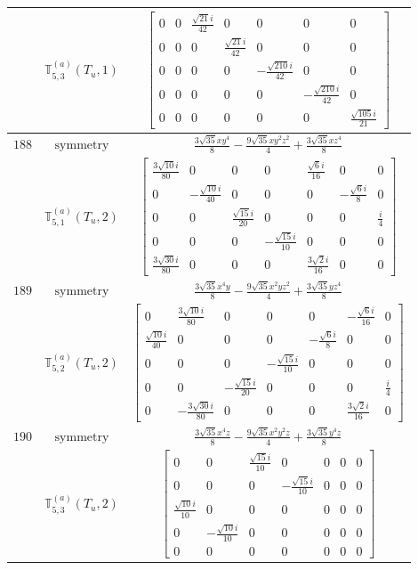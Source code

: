 \documentclass[fleqn,8pt,landscape]{jsarticle}
\begin{document}
\begin{longtable}{ccc}
$  $ & $ \mathbb{T}_{5,3}^{(a)}(T_{u},1) $ & $ \begin{bmatrix} 0 & 0 & \frac{\sqrt{21} i}{42} & 0 & 0 & 0 & 0 \\ 0 & 0 & 0 & \frac{\sqrt{21} i}{42} & 0 & 0 & 0 \\ 0 & 0 & 0 & 0 & - \frac{\sqrt{210} i}{42} & 0 & 0 \\ 0 & 0 & 0 & 0 & 0 & - \frac{\sqrt{210} i}{42} & 0 \\ 0 & 0 & 0 & 0 & 0 & 0 & \frac{\sqrt{105} i}{21} \end{bmatrix} $ \\ \hline
$ 188 $ & $ \text{symmetry} $ & $ \frac{3 \sqrt{35} x y^{4}}{8} - \frac{9 \sqrt{35} x y^{2} z^{2}}{4} + \frac{3 \sqrt{35} x z^{4}}{8} $ \\
$  $ & $ \mathbb{T}_{5,1}^{(a)}(T_{u},2) $ & $ \begin{bmatrix} \frac{3 \sqrt{10} i}{80} & 0 & 0 & 0 & \frac{\sqrt{6} i}{16} & 0 & 0 \\ 0 & - \frac{\sqrt{10} i}{40} & 0 & 0 & 0 & - \frac{\sqrt{6} i}{8} & 0 \\ 0 & 0 & \frac{\sqrt{15} i}{20} & 0 & 0 & 0 & \frac{i}{4} \\ 0 & 0 & 0 & - \frac{\sqrt{15} i}{10} & 0 & 0 & 0 \\ \frac{3 \sqrt{30} i}{80} & 0 & 0 & 0 & \frac{3 \sqrt{2} i}{16} & 0 & 0 \end{bmatrix} $ \\ \hline
$ 189 $ & $ \text{symmetry} $ & $ \frac{3 \sqrt{35} x^{4} y}{8} - \frac{9 \sqrt{35} x^{2} y z^{2}}{4} + \frac{3 \sqrt{35} y z^{4}}{8} $ \\
$  $ & $ \mathbb{T}_{5,2}^{(a)}(T_{u},2) $ & $ \begin{bmatrix} 0 & \frac{3 \sqrt{10} i}{80} & 0 & 0 & 0 & - \frac{\sqrt{6} i}{16} & 0 \\ \frac{\sqrt{10} i}{40} & 0 & 0 & 0 & - \frac{\sqrt{6} i}{8} & 0 & 0 \\ 0 & 0 & 0 & - \frac{\sqrt{15} i}{10} & 0 & 0 & 0 \\ 0 & 0 & - \frac{\sqrt{15} i}{20} & 0 & 0 & 0 & \frac{i}{4} \\ 0 & - \frac{3 \sqrt{30} i}{80} & 0 & 0 & 0 & \frac{3 \sqrt{2} i}{16} & 0 \end{bmatrix} $ \\ \hline
$ 190 $ & $ \text{symmetry} $ & $ \frac{3 \sqrt{35} x^{4} z}{8} - \frac{9 \sqrt{35} x^{2} y^{2} z}{4} + \frac{3 \sqrt{35} y^{4} z}{8} $ \\
$  $ & $ \mathbb{T}_{5,3}^{(a)}(T_{u},2) $ & $ \begin{bmatrix} 0 & 0 & \frac{\sqrt{15} i}{10} & 0 & 0 & 0 & 0 \\ 0 & 0 & 0 & - \frac{\sqrt{15} i}{10} & 0 & 0 & 0 \\ \frac{\sqrt{10} i}{10} & 0 & 0 & 0 & 0 & 0 & 0 \\ 0 & - \frac{\sqrt{10} i}{10} & 0 & 0 & 0 & 0 & 0 \\ 0 & 0 & 0 & 0 & 0 & 0 & 0 \end{bmatrix} $ \\ \hline

\end{longtable}
\end{document}
